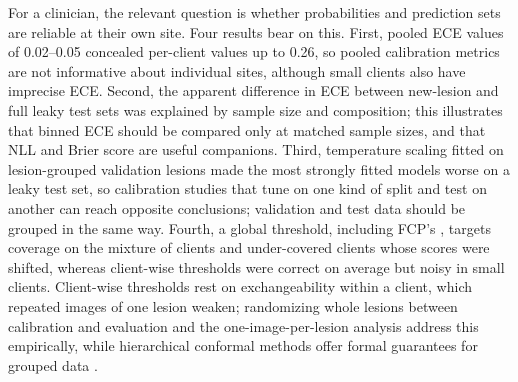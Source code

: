 For a clinician, the relevant question is whether probabilities and prediction sets are reliable at their
own site. Four results bear on this. First, pooled ECE values of 0.02--0.05 concealed per-client values up
to 0.26, so pooled calibration metrics are not informative about individual sites, although small clients
also have imprecise ECE. Second, the apparent difference in ECE between new-lesion and full leaky test sets was explained by
sample size and composition; this illustrates that binned ECE should be compared only at matched sample
sizes, and that NLL and Brier score are useful companions. Third, temperature scaling fitted on lesion-grouped validation
lesions made the most strongly fitted models worse on a leaky test set, so calibration studies that tune on
one kind of split and test on another can reach opposite conclusions; validation and test data should be
grouped in the same way. Fourth, a global threshold, including FCP's \cite{lu2023fcp}, targets coverage on
the mixture of clients and under-covered clients whose scores were shifted, whereas client-wise thresholds
were correct on average but noisy in small clients. Client-wise thresholds rest on exchangeability within a
client, which repeated images of one lesion weaken; randomizing whole lesions between calibration and
evaluation and the one-image-per-lesion analysis address this empirically, while hierarchical conformal
methods offer formal guarantees for grouped data \cite{dunn2022hierarchical,lee2023hierarchical}.

